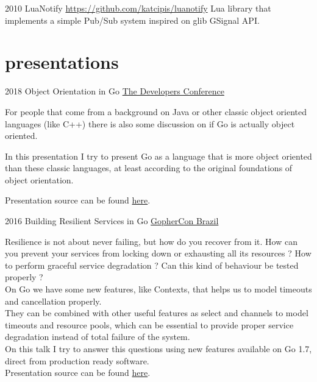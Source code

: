 \documentclass[]{friggeri-cv} %
\begin{document}
\begin{entrylist}
\entry
{2010}
{LuaNotify}
{\href{https://github.com/katcipis/luanotify}{https://github.com/katcipis/luanotify}}
{
Lua library that implements a simple Pub/Sub system
inspired on glib GSignal API.
}
\end{entrylist}
\pagebreak

\section{presentations}

\begin{entrylist}
\entry
{2018}
{Object Orientation in Go}
{\href{http://www.thedevelopersconference.com.br/tdc/2018/florianopolis/trilha-golang}{The Developers Conference}}
{

For people that come from a background on Java or other classic object oriented languages
(like C++) there is also some discussion on if Go is actually object oriented.

In this presentation I try to present Go as a language that is more object oriented than these
classic languages, at least according to the original foundations of object orientation.

Presentation source can be found \href{https://github.com/katcipis/my.presentations/blob/master/gooo/gooo.slide}{here}.

}
\end{entrylist}

\begin{entrylist}
\entry
{2016}
{Building Resilient Services in Go}
{\href{https://2016.gopherconbr.org/en/}{GopherCon Brazil}}
{

Resilience is not about never failing, but how do you recover from it.
How can you prevent your services from locking down or exhausting all its resources ?
How to perform graceful service degradation ? Can this kind of behaviour be tested properly ?\\

On Go we have some new features, like Contexts, that helps us to model timeouts and cancellation properly.\\

They can be combined with other useful features as select and channels to model timeouts and resource pools,
which can be essential to provide proper service degradation instead of total failure of the system.\\

On this talk I try to answer this questions using new features available on Go 1.7, direct from production ready software.\\

Presentation source can be found \href{https://github.com/katcipis/my.presentations/tree/master/resilient-services-in-go}{here}.

}
\end{entrylist}
\end{document}
